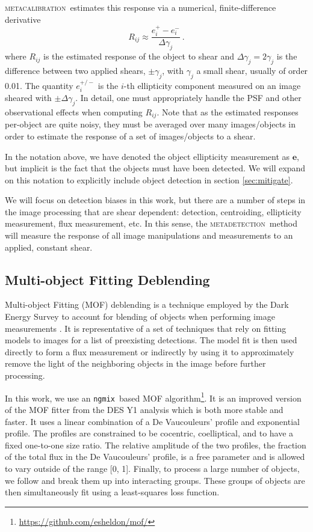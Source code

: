 \documentclass[fleqn,useAMS,usenatbib]{mnras}
\newcommand{\ngmix}{\texttt{ngmix}}
\newcommand{\mcal}{\textsc{metacalibration}}
\newcommand{\mdet}{\textsc{metadetection}}
\begin{document}
\mcal\ estimates this response via a numerical, finite-difference derivative
\begin{displaymath}
R_{ij} \approx \frac{e_i^{+} - e_i^{-}}{\Delta\gamma_j}\ .
\end{displaymath}
where $R_{ij}$ is the estimated response of the object to shear
and $\Delta\gamma_j = 2 \gamma_j$ is the difference between two applied
shears, $\pm \gamma_j$, with $\gamma_j$ a small shear, usually of order 0.01. The quantity
$e_i^{+/-}$ is the $i$-th ellipticity component measured on an image sheared with
$\pm\Delta\gamma_j$. In detail, one must appropriately handle the PSF and
other observational effects when computing $R_{ij}$. Note that as the
estimated responses per-object are quite noisy, they must be averaged
over many images/objects in order to estimate the response of a set of
images/objects to a shear.

In the notation above, we have denoted the object ellipticity measurement as
$\boldsymbol{e}$, but implicit is the fact that the objects must have been
detected.  We will expand on this notation to explicitly include object
detection in section \ref{sec:mitigate}.

We will focus on detection biases in this work, but there are a number of steps
in the image processing that are shear dependent: detection, centroiding,
ellipticity measurement, flux measurement, etc.  In this sense, the \mdet\
method will measure the response of all image manipulations and measurements to
an applied, constant shear.

\subsection{Multi-object Fitting Deblending}

Multi-object Fitting (MOF) deblending is a technique employed by the Dark
Energy Survey to account for blending of objects when performing image
measurements \citep{DESY1cat}. It is representative of a set of techniques that
rely on fitting models to images for a list of preexisting detections. The
model fit is then used directly to form a flux measurement or indirectly by
using it to approximately remove the light of the neighboring objects in the
image before further processing.

In this work, we use an \ngmix\ based MOF
algorithm\footnote{\url{https://github.com/esheldon/mof/}}. It is an improved
version of the MOF fitter from the DES Y1 analysis which is both more stable
and faster. It uses a linear combination of a De Vaucouleurs'
\citep{devauc1948} profile and exponential profile. The profiles are
constrained to be cocentric, coelliptical, and to have a fixed one-to-one size
ratio.  The relative amplitude of the two profiles, the fraction of the total
flux in the De Vaucouleurs' profile, is a free parameter and is allowed to vary
outside of the range [0, 1]. Finally, to process a large number of objects, we
follow \citet{DESY1cat} and break them up into interacting groups.  These
groups of objects are then simultaneously fit using a least-squares loss
function.
\end{document}
